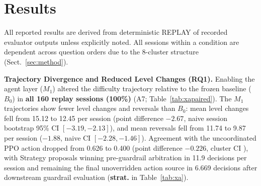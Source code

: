 \section{Results}\label{sec:results}
All reported results are derived from deterministic REPLAY of recorded evaluator outputs unless explicitly noted. All sessions within a condition are dependent across question orders due to the 8-cluster structure (Sect.~\ref{sec:method}).

\noindent\textbf{Trajectory Divergence and Reduced Level Changes (RQ1).} Enabling the agent layer ($M_1$) altered the difficulty trajectory relative to the frozen baseline ($B_0$) in \textbf{all 160 replay sessions (100\%)} (A7; Table~\ref{tab:xapaired}). The $M_1$ trajectories show fewer level changes and reversals than $B_0$: mean level changes fell from 15.12 to 12.45 per session (point difference $-2.67$, naive session bootstrap 95\% CI $[-3.19, -2.13]$), and mean reversals fell from 11.74 to 9.87 per session ($-1.88$, naive CI $[-2.28, -1.46]$). Agreement with the uncoordinated PPO action dropped from 0.626 to 0.400 (point difference $-0.226$, cluster CI \phagrci{}), with Strategy proposals winning pre-guardrail arbitration in 11.9 decisions per session and remaining the final unoverridden action source in 6.669 decisions after downstream guardrail evaluation (\textbf{strat.} in Table~\ref{tab:xa}).


\begin{table}[tbp]
\centering\scriptsize\setlength{\tabcolsep}{3pt}
\caption{Replay ablation summary across 160 sessions per condition (mean per session unless noted as counts). \textbf{compl./auth./trans.}: sessions completing, keeping committed scores authoritative, and preserving valid transitions. \textbf{chg./rev.}: mean level changes and reversals; \textbf{agr.}: fraction of decisions agreeing with the PPO action; \textbf{gfire}: guardrail overrides; \textbf{strat.}: decisions where the Strategy Agent was the final action source; \textbf{byp.}: sessions with guardrail bypass; \textbf{p50/p95}: pooled per-turn latency in ms; \textbf{calls}: agent calls per session.}\label{tab:xa}
\resizebox{\textwidth}{!}{}
\end{table}

\begin{table}[tbp]
\centering\scriptsize\setlength{\tabcolsep}{3pt}
\caption{Paired differences ($A - B$) over identical 160 replay sessions: fraction of sessions with divergent difficulty paths, paired mean differences with naive session-level 95\% percentile-bootstrap intervals, and pooled median turn latency delta. Intervals are descriptive due to cluster reuse.}\label{tab:xapaired}
\resizebox{\textwidth}{!}{}
\end{table}

